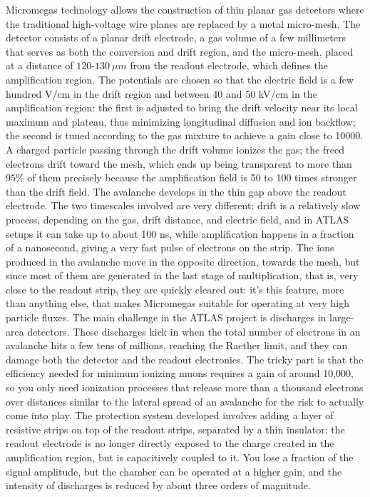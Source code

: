 \documentclass[11pt,a4paper,twoside,openright]{report}
\begin{document}
Micromegas technology \cite{ATLASdesc} allows the construction of thin planar gas detectors where the traditional high-voltage wire planes are replaced by a metal micro-mesh. The detector consists of a planar drift electrode, a gas volume of a few millimeters that serves as both the conversion and drift region, and the micro-mesh, placed at a distance of \(120\text{-}130\ \mu m\) from the readout electrode, which defines the amplification region. The potentials are chosen so that the electric field is a few hundred V/cm in the drift region and between 40 and 50 kV/cm in the amplification region: the first is adjusted to bring the drift velocity near its local maximum and plateau, thus minimizing longitudinal diffusion and ion backflow; the second is tuned according to the gas mixture to achieve a gain close to 10000. A charged particle passing through the drift volume ionizes the gas; the freed electrons drift toward the mesh, which ends up being transparent to more than \(95\%\) of them precisely because the amplification field is 50 to 100 times stronger than the drift field. The avalanche develops in the thin gap above the readout electrode. The two timescales involved are very different: drift is a relatively slow process, depending on the gas, drift distance, and electric field, and in ATLAS setups it can take up to about 100 ns, while amplification happens in a fraction of a nanosecond, giving a very fast pulse of electrons on the strip. The ions produced in the avalanche move in the opposite direction, towards the mesh, but since most of them are generated in the last stage of multiplication, that is, very close to the readout strip, they are quickly cleared out: it’s this feature, more than anything else, that makes Micromegas suitable for operating at very high particle fluxes. The main challenge in the ATLAS project is discharges in large-area detectors. These discharges kick in when the total number of electrons in an avalanche hits a few tens of millions, reaching the Raether limit, and they can damage both the detector and the readout electronics. The tricky part is that the efficiency needed for minimum ionizing muons requires a gain of around 10,000, so you only need ionization processes that release more than a thousand electrons over distances similar to the lateral spread of an avalanche for the risk to actually come into play. The protection system developed involves adding a layer of resistive strips on top of the readout strips, separated by a thin insulator: the readout electrode is no longer directly exposed to the charge created in the amplification region, but is capacitively coupled to it. You lose a fraction of the signal amplitude, but the chamber can be operated at a higher gain, and the intensity of discharges is reduced by about three orders of magnitude.
\end{document}
